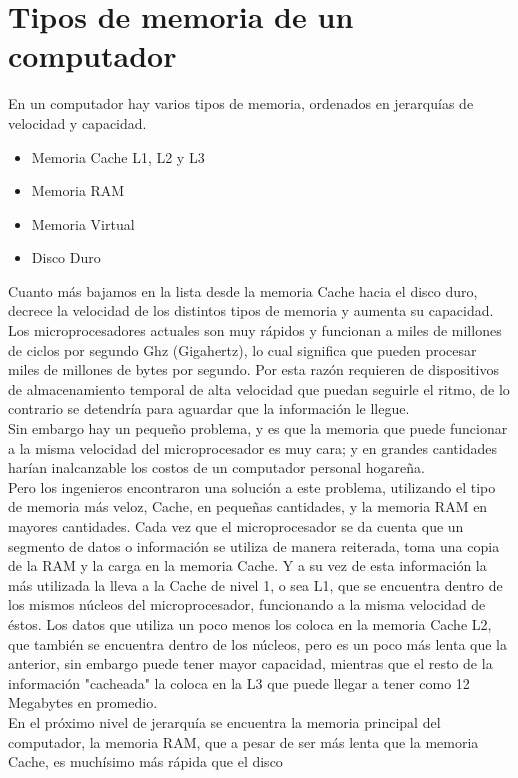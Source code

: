 \documentclass{article}
\begin{document}
\section*{Tipos de memoria de un computador}
En un computador hay varios tipos de memoria, ordenados en jerarquías de velocidad y
capacidad.
\begin{itemize}
\item Memoria Cache L1, L2 y L3
\item Memoria RAM
\item Memoria Virtual
\item Disco Duro
\end{itemize}
Cuanto más bajamos en la lista desde la memoria Cache hacia el disco duro, decrece la velocidad
de los distintos tipos de memoria y aumenta su capacidad.\\[0.1cm]
Los microprocesadores actuales son muy rápidos y funcionan a miles de millones de ciclos por
segundo Ghz (Gigahertz), lo cual significa que pueden procesar miles de millones de bytes por
segundo. Por esta razón requieren de dispositivos de almacenamiento temporal de alta
velocidad que puedan seguirle el ritmo, de lo contrario se detendría para aguardar que la
información le llegue.\\[0.1cm]
Sin embargo hay un pequeño problema, y es que la memoria que puede funcionar a la misma
velocidad del microprocesador es muy cara; y en grandes cantidades harían inalcanzable los
costos de un computador personal hogareña.\\[0.1cm]
Pero los ingenieros encontraron una solución a este problema, utilizando el tipo de memoria
más veloz, Cache, en pequeñas cantidades, y la memoria RAM en mayores cantidades. Cada vez
que el microprocesador se da cuenta que un segmento de datos o información se utiliza de
manera reiterada, toma una copia de la RAM y la carga en la memoria Cache. Y a su vez de esta
información la más utilizada la lleva a la Cache de nivel 1, o sea L1, que se encuentra dentro de
los mismos núcleos del microprocesador, funcionando a la misma velocidad de éstos. Los datos
que utiliza un poco menos los coloca en la memoria Cache L2, que también se encuentra dentro
de los núcleos, pero es un poco más lenta que la anterior, sin embargo puede tener mayor
capacidad, mientras que el resto de la información "cacheada" la coloca en la L3 que puede
llegar a tener como 12 Megabytes en promedio.\\[0.1cm]
En el próximo nivel de jerarquía se encuentra la memoria principal del computador, la memoria
RAM, que a pesar de ser más lenta que la memoria Cache, es muchísimo más rápida que el disco
\end{document}
